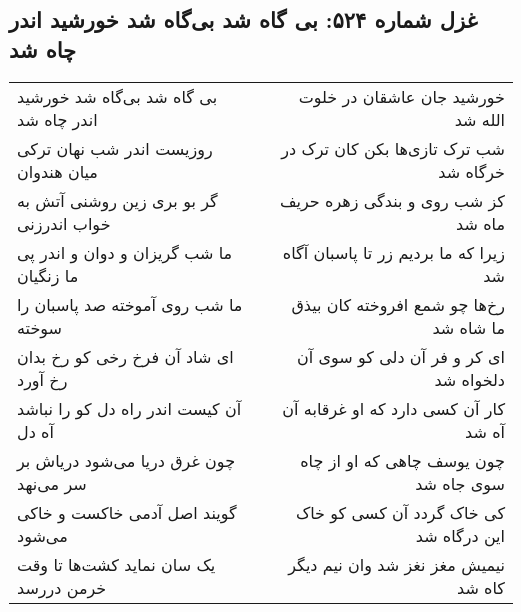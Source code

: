 \begin{center}
\section*{غزل شماره ۵۲۴: بی گاه شد بی‌گاه شد خورشید اندر چاه شد}
\label{sec:0524}
\begin{longtable}{l p{0.5cm} r}
بی گاه شد بی‌گاه شد خورشید اندر چاه شد
&&
خورشید جان عاشقان در خلوت الله شد
\\
روزیست اندر شب نهان ترکی میان هندوان
&&
شب ترک تازی‌ها بکن کان ترک در خرگاه شد
\\
گر بو بری زین روشنی آتش به خواب اندرزنی
&&
کز شب روی و بندگی زهره حریف ماه شد
\\
ما شب گریزان و دوان و اندر پی ما زنگیان
&&
زیرا که ما بردیم زر تا پاسبان آگاه شد
\\
ما شب روی آموخته صد پاسبان را سوخته
&&
رخ‌ها چو شمع افروخته کان بیذق ما شاه شد
\\
ای شاد آن فرخ رخی کو رخ بدان رخ آورد
&&
ای کر و فر آن دلی کو سوی آن دلخواه شد
\\
آن کیست اندر راه دل کو را نباشد آه دل
&&
کار آن کسی دارد که او غرقابه آن آه شد
\\
چون غرق دریا می‌شود دریاش بر سر می‌نهد
&&
چون یوسف چاهی که او از چاه سوی جاه شد
\\
گویند اصل آدمی خاکست و خاکی می‌شود
&&
کی خاک گردد آن کسی کو خاک این درگاه شد
\\
یک سان نماید کشت‌ها تا وقت خرمن دررسد
&&
نیمیش مغز نغز شد وان نیم دیگر کاه شد
\\
\end{longtable}
\end{center}
